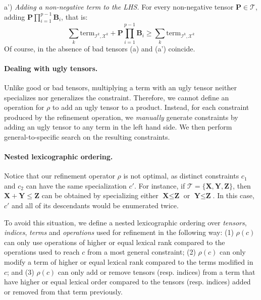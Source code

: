 \documentclass{article}
\newcommand{\luc}[1]{{\bf \textcolor{red}{{Luc: #1}}}}
\newcommand{\stefano}[1]{{\bf \textcolor{violet}{{Stefano: #1}}}}
\newcommand{\tensors}{\ensuremath{\mathcal{T}}\xspace}
\newcommand{\indices}{\ensuremath{\mathcal{I}}\xspace}
\newcommand{\factors}{\ensuremath{\mathcal{X}}\xspace}
\newcommand{\TERM}[2]{\ensuremath{\mathrm{term}_{#1,#2}}\xspace}
\renewcommand\[{\begin{equation}}
\renewcommand\]{\end{equation}}
\newcommand{\TB}{\textbf{B}\xspace}
\newcommand{\TP}{\textbf{P}\xspace}
\newcommand{\TX}{\textbf{X}\xspace}
\newcommand{\TY}{\textbf{Y}\xspace}
\newcommand{\TZ}{\textbf{Z}\xspace}
\begin{document}
a') \emph{Adding a non-negative term to the LHS.}  For every non-negative
tensor $\TP \in \tensors$, adding $\TP \prod_{i=1}^{p-1}\TB_i$, that is:
%
$$
    \textstyle
    \sum_k \TERM{\indices^k}{\factors^k} + \TP \prod_{i=1}^{p-1}\TB_i \ge \sum_k \TERM{\indices^k}{\factors^k}
$$
Of course, in the absence of bad tensors (a) and (a') coincide.


\paragraph{Dealing with ugly tensors.}  Unlike good or bad tensors, multiplying
a term with an ugly tensor neither specializes nor generalizes the constraint.
Therefore, we cannot define an operation for $\rho$ to add an ugly tensor to a
product.  Instead, for each constraint produced by the refinement operation, we
\emph{manually} generate constraints by adding an ugly tensor to any term in
the left hand side.  We then perform general-to-specific search on the
resulting constraints.




\paragraph{Nested lexicographic ordering.}  Notice that our refinement operator
$\rho$ is not optimal, as distinct constraints $c_1$ and $c_2$ can have the
same specialization $c'$.  For instance, if $\tensors = \{\TX, \TY, \TZ\}$,
then $\TX + \TY \le \TZ$ can be obtained by specializing either $\TX \le \TZ$
or $\TY \le \TZ$.  In this case, $c'$ and all of its descendants would be
enumerated twice.

To avoid this situation, we define a nested lexicographic ordering over
\emph{tensors}, \emph{indices}, \emph{terms} and \emph{operations} used for
refinement in the following way:
%
(1) $\rho(c)$ can only use operations of higher or equal lexical rank compared
to the operations used to reach $c$ from a most general constraint;
%
(2) $\rho(c)$ can only modify a term of higher or equal lexical rank compared
to the terms modified in $c$; and
%
(3) $\rho(c)$ can only add or remove tensors (resp. indices) from a term that
have higher or equal lexical order compared to the tensors (resp. indices)
added or removed from that term previously.
\end{document}
